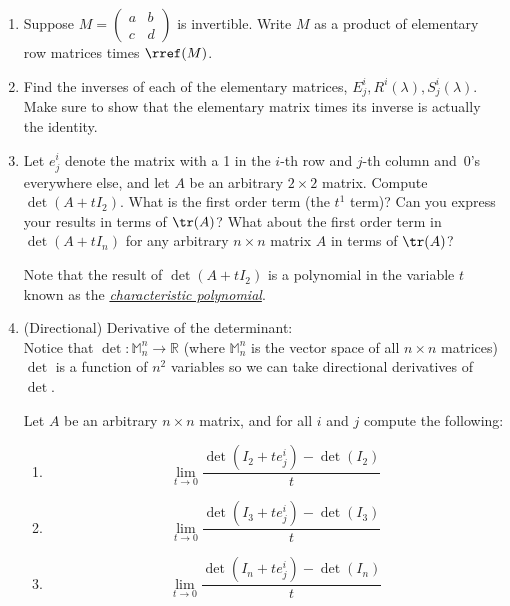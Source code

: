 \begin{enumerate}

\item Suppose $M=\begin{pmatrix}
a & b \\
c & d
\end{pmatrix}$ is invertible.  Write $M$ as a product of elementary row matrices times $\rref(M)$.


\item Find the inverses of each of the elementary matrices, $E^i_j, R^i(\lambda), S^i_j(\lambda)$.  Make sure to show that the elementary matrix times its inverse is actually the identity.


\item \label{prob_determinant_trace} %
Let $e^i_j$ denote the matrix with a 1 in the $i$-th row and $j$-th column and~0's everywhere else, and let $A$ be an arbitrary $2 \times 2$ matrix. Compute $\det(A + t I_2)$. What is the first order term (the $t^{1}$ term)? Can you express your results in terms of $\tr(A)$? What about the first order term in $\det(A + t I_n)$ for any arbitrary $n \times n$ matrix $A$ in terms of $\tr(A)$?

Note that the result of $\det(A + t I_2)$ is a polynomial in the variable $t$ known as the \emph{\hyperlink{characteristic_polynomial}{characteristic polynomial}}.%


\item \label{prob_derivative_determinant}
(Directional) Derivative of the determinant:\\ 
Notice that $\det \colon\mathbb{M}_n^n \rightarrow \mathbb{R}$ (where $\mathbb{M}_n^n$ is the vector space of all $n \times n$ matrices)  $\det$ is a function of $n^2$ variables so we can take directional derivatives of $\det$. 

Let $A$ be an arbitrary $n \times n$ matrix, and for all $i$ and $j$ compute the following:
\begin{enumerate}
\item \[
\lim_{t \rightarrow 0} \frac{\det(I_2 + t e^i_j) - \det(I_2)}{t}
\]

\item \[
\lim_{t \rightarrow 0} \frac{\det(I_3 + t e^i_j) - \det(I_3)}{t}
\]

\item \[
\lim_{t \rightarrow 0} \frac{\det(I_n + t e^i_j)  - \det(I_n)}{t}
\]


\end{enumerate}
\end{enumerate}
